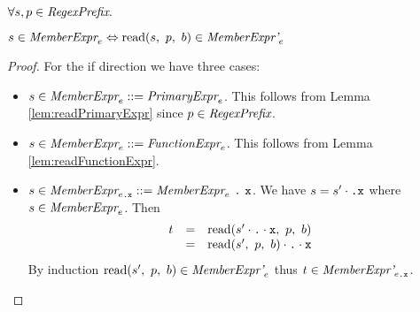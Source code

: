 \documentclass[preprint,10pt]{sigplanconf}
\begin{document}
\begin{lemma}\mbox{}

  \( \forall s, p \in \textit{RegexPrefix}. \)

  \( s \in \textit{MemberExpr}_{e} \Leftrightarrow 
  \textrm{read}(s,~p,~b) \in \textit{MemberExpr'}_{e} \)
\end{lemma}
\begin{proof}
  For the if direction we have three cases:
  \begin{itemize}
  \item \( s \in \textit{MemberExpr}_{e} ::=
    \textit{PrimaryExpr}_{e} \). This follows from Lemma
    \ref{lem:readPrimaryExpr} since \( p \in \textit{RegexPrefix} \).
    
  \item \( s \in \textit{MemberExpr}_{e} ::=
    \textit{FunctionExpr}_{e} \). This follows from Lemma
    \ref{lem:readFunctionExpr}.
    
  \item \( s \in \textit{MemberExpr}_{e\texttt{.\texttt{x}}} ::=
    \textit{MemberExpr}_{e} ~\texttt{.}~\texttt{x} \). We have 
    \( s = s' \cdot \texttt{.} \texttt{x} \) where \( s \in
    \textit{MemberExpr}_{e} \). Then
    \[
    \begin{array}{rcl}
      t &=& \textrm{read}(s' \cdot \texttt{.} \cdot \texttt{x},~p,~b)
      \\
      &=& \textrm{read}(s',~p,~b) \cdot \texttt{.} \cdot \texttt{x}
    \end{array}
    \]
    By induction \( \textrm{read}(s',~p,~b) \in \textit{MemberExpr'}_{e}
    \) thus \( t \in \textit{MemberExpr'}_{e\texttt{.\texttt{x}}} \).
  \end{itemize}
\end{proof}
\end{document}
